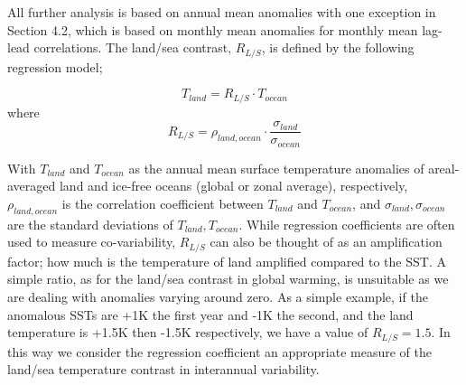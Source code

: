 All further analysis is based on annual mean anomalies with one exception in 
Section 4.2, which is based on monthly mean anomalies for monthly mean lag-lead
correlations. The land/sea contrast, $R_{L/S}$, is defined by the following 
regression model;

\begin{equation}
T_{land} = R_{L/S} \cdot T_{ocean}
\end{equation}
where
\begin{equation}
	R_{L/S} = \rho_{land,ocean}\cdot \frac{\sigma_{land}}{\sigma_{ocean}}
\end{equation}

With $T_{land}$ and $T_{ocean}$ as the annual mean surface temperature anomalies 
of areal-averaged land and ice-free oceans (global or zonal average), 
respectively, $\rho_{land,ocean}$ is the correlation coefficient between 
$T_{land}$ and $T_{ocean}$, and $\sigma_{land}, \sigma_{ocean}$ are the standard 
deviations of $T_{land}, T_{ocean}$. While regression coefficients are often 
used to measure co-variability, $R_{L/S}$ can also be thought of as an 
amplification factor; how much is the temperature of land amplified compared to 
the SST. A simple ratio, as for the land/sea contrast in global warming, is 
unsuitable as we are dealing with anomalies varying around zero. As a simple 
example, if the anomalous SSTs are +1K the first year and -1K the second, and 
the land temperature is +1.5K then -1.5K respectively, we have a value of 
$R_{L/S} = 1.5$. In this way we consider the regression coefficient an 
appropriate measure of the land/sea temperature contrast in interannual 
variability.